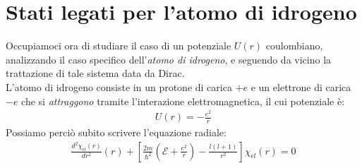 \documentclass[../../FisicaTeorica.tex]{subfiles}
\begin{document}
\section{Stati legati per l'atomo di idrogeno}
Occupiamoci ora di studiare il caso di un potenziale $U(r)$ coulombiano, analizzando il caso specifico dell'\textit{atomo di idrogeno}, e seguendo da vicino la trattazione di tale sistema data da Dirac.\\

L'atomo di idrogeno consiste in un protone di carica $+e$ e un elettrone di carica $-e$ che si \textit{attraggono} tramite l'interazione elettromagnetica, il cui potenziale è:
\begin{align*}
U(r) = -\frac{e^2}{r}
\end{align*}
Possiamo perciò subito scrivere l'equazione radiale:
\begin{align}
\frac{d^2\chi_{\epsilon l}(r)}{dr^2}(r) +\left[\frac{2m}{\hbar^2}\left(\mathcal{E}+\frac{e^2}{r}\right)-\frac{l(l+1)}{r^2}\right]\chi_{\epsilon l}(r) = 0
\label{eqn:autovalori_idrogeno_rad}
\end{align}
\end{document}
